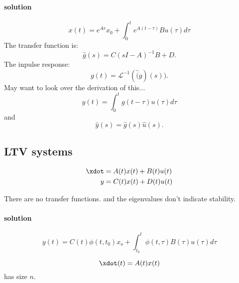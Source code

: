 \documentclass[10pt]{article}
\begin{document}
\paragraph{solution}
\begin{equation*}
  x(t) = e^{Ar}x_0 + \int_0^te^{A(t-\tau)}Bu(\tau)d\tau
\end{equation*}
The transfer function is:
\begin{equation*}
  \hat{g}(s) = C(sI - A)^{-1}B + D.
\end{equation*}
The inpulse response:
\begin{equation*}
  g(t) = \mathcal{L}^{-1}(\hat(g)(s)).
\end{equation*}
May want to look over the derivation of this...
\begin{equation*}
  y(t) = \int_0^tg(t-\tau)u(\tau)d\tau
\end{equation*}
and 
\begin{equation*}
  \hat{y}(s) = \hat{g}(s)\hat{u}(s).
\end{equation*}


\subsection{LTV systems}
\begin{equation*}
  \begin{split}
    \xdot &= A(t)x(t) + B(t)u(t) \\
    y  &= C(t)x(t) + D(t)u(t)
  \end{split}
\end{equation*}

There are no transfer functions. and the eigenvalues don't indicate
stability. 

\paragraph{solution}
\begin{equation*}
  y(t) = C(t) \phi(t,t_0)x_o +
  \int_{t_0}^t\phi(t,\tau)B(\tau)u(\tau)d\tau
\end{equation*}

\begin{equation*}
  \xdot(t) = A(t)x(t) 
\end{equation*}
has size $n$.
\end{document}
